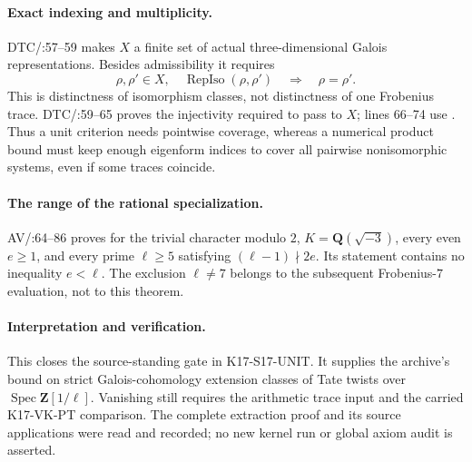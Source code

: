 \paragraph{Exact indexing and multiplicity.}
DTC/:57--59 makes $X$ a finite set of actual
three-dimensional Galois representations.  Besides admissibility it
requires
\[
\rho,\rho'\in X,\quad\operatorname{RepIso}(\rho,\rho')
\quad\Longrightarrow\quad\rho=\rho'.
\]
This is distinctness of isomorphism classes, not distinctness of one
Frobenius trace.  DTC/:59--65 proves the
injectivity required to pass to $X$; lines 66--74 use
.  Thus a unit criterion needs pointwise coverage,
whereas a numerical product bound must keep enough eigenform indices
to cover all pairwise nonisomorphic systems, even if some traces coincide.

\paragraph{The range of the rational specialization.}
AV/:64--86 proves
 for the trivial character modulo $2$, $K=\mathbf Q(\sqrt{-3})$,
every even $e\ge1$, and every prime $\ell\ge5$ satisfying
$(\ell-1)\nmid2e$.  Its statement contains no inequality $e<\ell$.
The exclusion $\ell\ne7$ belongs to the subsequent Frobenius-$7$
evaluation, not to this  theorem.

\paragraph{Interpretation and verification.}
This closes the source-standing gate in K17-S17-UNIT.  It supplies the
archive's bound on strict Galois-cohomology extension classes of Tate
twists over $\operatorname{Spec}\mathbf Z[1/\ell]$.
Vanishing still requires the arithmetic trace input and the carried
K17-VK-PT comparison.  The complete extraction proof and its source
applications were read and recorded; no new kernel run or global
axiom audit is asserted.
